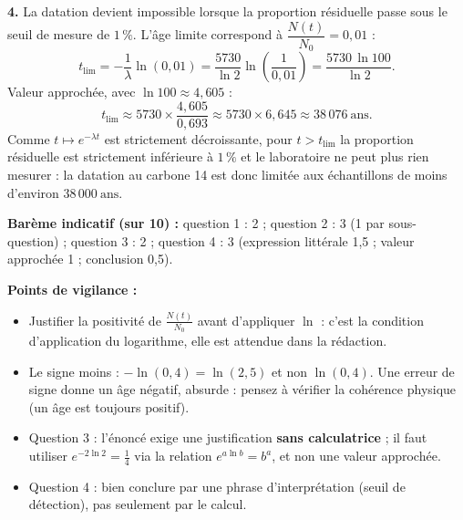 \documentclass[11pt]{article}
\begin{document}
\begin{corrige}
\textbf{4.} La datation devient impossible lorsque la proportion résiduelle passe sous le seuil de mesure de $1\,\%$. L'âge limite correspond à $\dfrac{N(t)}{N_0} = 0{,}01$ :
\[ t_{\text{lim}} = -\frac{1}{\lambda}\ln(0{,}01) = \frac{5730}{\ln 2}\ln\!\left(\frac{1}{0{,}01}\right) = \boxed{\frac{5730\,\ln 100}{\ln 2}}. \]
Valeur approchée, avec $\ln 100 \approx 4{,}605$ :
\[ t_{\text{lim}} \approx 5730 \times \frac{4{,}605}{0{,}693} \approx 5730 \times 6{,}645 \approx 38\,076\ \text{ans}. \]
Comme $t \mapsto e^{-\lambda t}$ est strictement décroissante, pour $t > t_{\text{lim}}$ la proportion résiduelle est strictement inférieure à $1\,\%$ et le laboratoire ne peut plus rien mesurer : la datation au carbone 14 est donc limitée aux échantillons de moins d'environ $\boxed{38\,000\ \text{ans}}$.

\textbf{Barème indicatif (sur 10) :} question 1 : 2 ; question 2 : 3 (1 par sous-question) ; question 3 : 2 ; question 4 : 3 (expression littérale 1,5 ; valeur approchée 1 ; conclusion 0,5).

\textbf{Points de vigilance :}
\begin{itemize}
\item Justifier la positivité de $\frac{N(t)}{N_0}$ avant d'appliquer $\ln$ : c'est la condition d'application du logarithme, elle est attendue dans la rédaction.
\item Le signe moins : $-\ln(0{,}4) = \ln(2{,}5)$ et non $\ln(0{,}4)$. Une erreur de signe donne un âge négatif, absurde : pensez à vérifier la cohérence physique (un âge est toujours positif).
\item Question 3 : l'énoncé exige une justification \textbf{sans calculatrice} ; il faut utiliser $e^{-2\ln 2} = \frac{1}{4}$ via la relation $e^{a\ln b} = b^a$, et non une valeur approchée.
\item Question 4 : bien conclure par une phrase d'interprétation (seuil de détection), pas seulement par le calcul.
\end{itemize}
\end{corrige}
\end{document}
